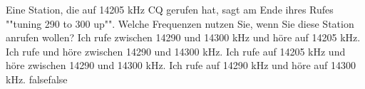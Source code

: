     {Eine Station, die auf 14205 kHz CQ gerufen hat, sagt am Ende ihres Rufes ""tuning 290 to 300 up"". Welche Frequenzen nutzen Sie, wenn Sie diese Station anrufen wollen?}
    {Ich rufe zwischen 14290 und 14300 kHz und höre auf 14205 kHz.}
    {Ich rufe und höre zwischen 14290 und 14300 kHz.}
    {Ich rufe auf 14205 kHz und höre zwischen 14290 und 14300 kHz.}
    {Ich rufe auf 14290 kHz und höre auf 14300 kHz.}
    {false}{false}